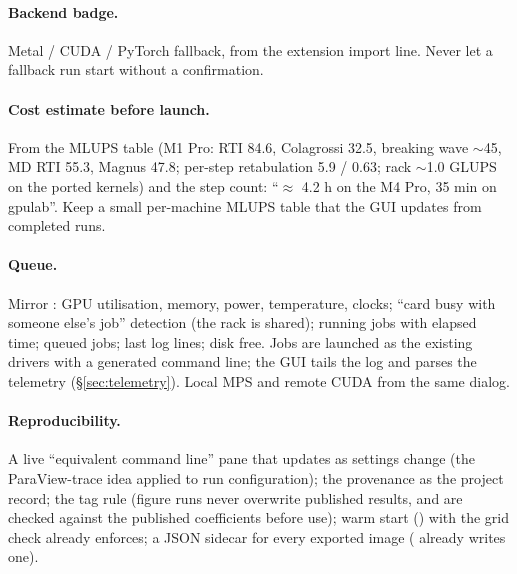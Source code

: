 \documentclass[11pt,a4paper]{article}
\begin{document}
\paragraph{Backend badge.} Metal / CUDA / PyTorch fallback, from the extension
import line. Never let a fallback run start without a confirmation.

\paragraph{Cost estimate before launch.} From the MLUPS table (M1 Pro: RTI 84.6,
Colagrossi 32.5, breaking wave $\sim$45, MD RTI 55.3, Magnus 47.8; per-step
retabulation 5.9 / 0.63; rack $\sim$1.0 GLUPS on the ported kernels) and the step
count: ``$\approx$ 4.2 h on the M4 Pro, 35 min on gpulab''. Keep a small per-machine
MLUPS table that the GUI updates from completed runs.

\paragraph{Queue.} Mirror : GPU utilisation, memory, power,
temperature, clocks; ``card busy with someone else's job'' detection (the rack is
shared); running jobs with elapsed time; queued jobs; last log lines; disk free. Jobs
are launched as the existing drivers with a generated command line; the GUI tails
the log and parses the telemetry (\S\ref{sec:telemetry}). Local MPS and remote
CUDA from the same dialog.

\paragraph{Reproducibility.} A live ``equivalent command line'' pane that updates as
settings change (the ParaView-trace idea applied to run configuration); the
provenance  as the project record; the  tag rule (figure
runs never overwrite published results, and are checked against the published
coefficients before use); warm start () with the grid check
 already enforces; a JSON sidecar for every exported image
( already writes one).

\end{document}
